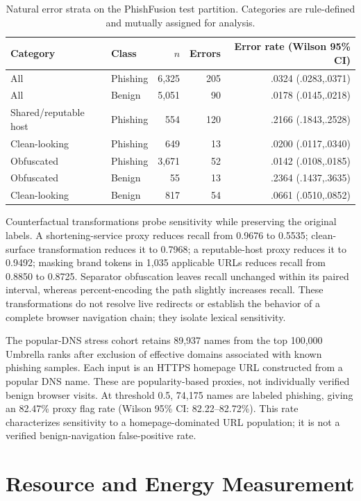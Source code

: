 \documentclass[10pt]{article}
\newcommand{\blue}[1]{{\color{black}#1}}
\begin{document}
\begin{table}[ht]
\centering
\caption{Natural error strata on the PhishFusion test partition. Categories are rule-defined and mutually assigned for analysis.}
\begin{tabular}{llrrr}
\toprule
Category & Class & $n$ & Errors & Error rate (Wilson 95\% CI) \\
\midrule
All & Phishing & 6,325 & 205 & .0324 (.0283,.0371) \\
All & Benign & 5,051 & 90 & .0178 (.0145,.0218) \\
Shared/reputable host & Phishing & 554 & 120 & .2166 (.1843,.2528) \\
Clean-looking & Phishing & 649 & 13 & .0200 (.0117,.0340) \\
Obfuscated & Phishing & 3,671 & 52 & .0142 (.0108,.0185) \\
Obfuscated & Benign & 55 & 13 & .2364 (.1437,.3635) \\
Clean-looking & Benign & 817 & 54 & .0661 (.0510,.0852) \\
\bottomrule
\end{tabular}
\end{table}

Counterfactual transformations probe sensitivity while preserving the original labels. A shortening-service proxy reduces recall from 0.9676 to 0.5535; clean-surface transformation reduces it to 0.7968; a reputable-host proxy reduces it to 0.9492; masking brand tokens in 1,035 applicable URLs reduces recall from 0.8850 to 0.8725. Separator obfuscation leaves recall unchanged within its paired interval, whereas percent-encoding the path slightly increases recall. These transformations do not resolve live redirects or establish the behavior of a complete browser navigation chain; they isolate lexical sensitivity.

The popular-DNS stress cohort retains 89,937 names from the top 100,000 Umbrella ranks after exclusion of effective domains associated with known phishing samples. \blue{Each input is an HTTPS homepage URL constructed from a popular DNS name. These are popularity-based proxies, not individually verified benign browser visits.} At threshold 0.5, 74,175 names are labeled phishing, giving an 82.47\% proxy flag rate (Wilson 95\% CI: 82.22--82.72\%). \blue{This rate characterizes sensitivity to a homepage-dominated URL population; it is not a verified benign-navigation false-positive rate.}

\section{Resource and Energy Measurement}
\end{document}
